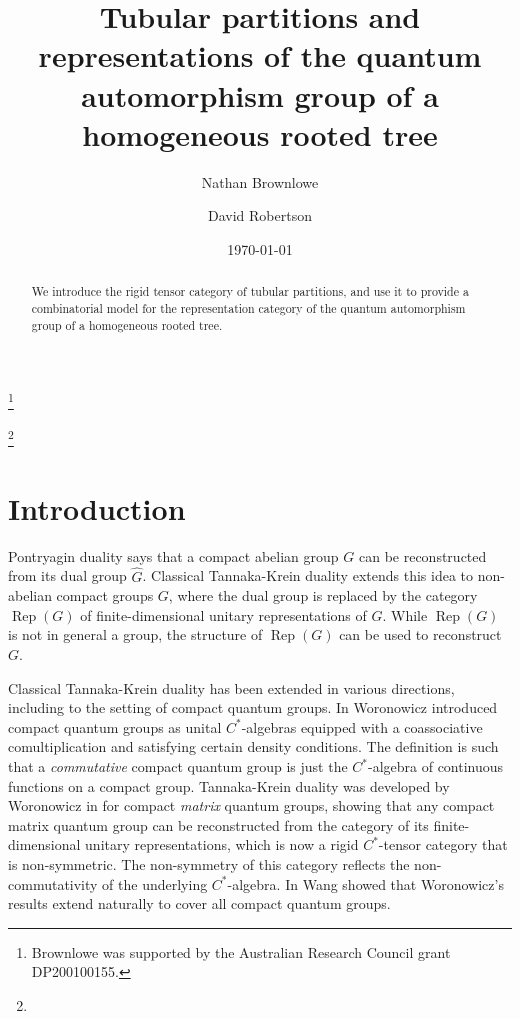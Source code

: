 \documentclass[12pt, a4paper]{amsart}
\def\Rep{\operatorname{Rep}}
\theoremstyle{definition}
\theoremstyle{remark}
\numberwithin{equation}{section}
\begin{document}
\date{\today}
\title[Notes on tubes]{Tubular partitions and representations of the quantum automorphism group of a homogeneous rooted tree}
\author{Nathan Brownlowe}
\address{Nathan Brownlowe, School of Mathematics and Statistics, University of Sydney,
NSW 2006, Australia.}

\author{David Robertson}
\address{David Robertson, School of Science and Technology, University of New England, NSW 2351, Australia.}

 \thanks{Brownlowe was supported by the Australian Research Council grant DP200100155.}

\subjclass[2010]{}
\keywords{}
\thanks{}

\begin{abstract}
We introduce the rigid tensor category of tubular partitions, and use it to provide a combinatorial model for the representation category of the quantum automorphism group of a homogeneous rooted tree.
\end{abstract}

\maketitle

\setcounter{tocdepth}{1}


\section{Introduction}

Pontryagin duality says that a compact abelian group $G$ can be reconstructed from its dual group $\hat{G}$. Classical Tannaka-Krein duality extends this idea to non-abelian compact groups $G$, where the dual group is replaced by the category $\Rep(G)$ of finite-dimensional unitary representations of $G$. While $\Rep(G)$ is not in general a group, the structure of $\Rep(G)$ can be used to reconstruct $G$.

Classical Tannaka-Krein duality has been extended in various directions, including to the setting of compact quantum groups. In \cite{Wor87} Woronowicz introduced compact quantum groups as unital $C^*$-algebras equipped with a coassociative comultiplication and satisfying certain density conditions. The definition is such that a \textit{commutative} compact quantum group is just the $C^*$-algebra of continuous functions on a compact group. Tannaka-Krein duality was developed by Woronowicz in \cite{Wor88} for compact \textit{matrix} quantum groups, showing that any compact matrix quantum group can be reconstructed from the category of its finite-dimensional unitary representations, which is now a rigid $C^*$-tensor category that is non-symmetric. The non-symmetry of this category reflects the non-commutativity of the underlying $C^*$-algebra. In \cite{Wang97} Wang showed that Woronowicz's results extend naturally to cover all compact quantum groups. 
\end{document}
